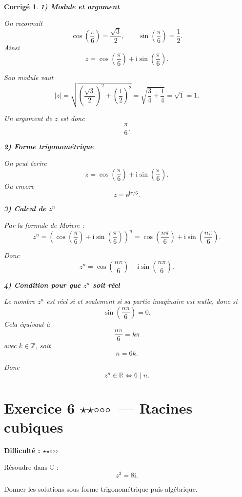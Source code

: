 \documentclass[11pt,a4paper]{article}
\newtheorem*{corrige}{Corrigé}
\newcommand{\C}{\mathbb{C}}
\newcommand{\R}{\mathbb{R}}
\newcommand{\ii}{\mathrm{i}}
\newcommand{\e}{\mathrm{e}}
\newcommand{\fullstar}{\(\star\)}
\newcommand{\emptystar}{\(\circ\)}
\newcommand{\twoStars}{\fullstar\fullstar\emptystar\emptystar\emptystar}
\newcommand{\difficulty}[1]{\textbf{Difficulté : #1}}
\begin{document}
\begin{corrige}
\textbf{1) Module et argument}

On reconnaît
\[
\cos\left(\frac{\pi}{6}\right)=\frac{\sqrt3}{2},
\qquad
\sin\left(\frac{\pi}{6}\right)=\frac12.
\]
Ainsi
\[
z=\cos\left(\frac{\pi}{6}\right)+\ii\sin\left(\frac{\pi}{6}\right).
\]

Son module vaut
\[
|z|=\sqrt{\left(\frac{\sqrt3}{2}\right)^2+\left(\frac12\right)^2}
=\sqrt{\frac34+\frac14}=\sqrt1=1.
\]

Un argument de \(z\) est donc
\[
\frac{\pi}{6}.
\]

\textbf{2) Forme trigonométrique}

On peut écrire
\[
z=\cos\left(\frac{\pi}{6}\right)+\ii\sin\left(\frac{\pi}{6}\right).
\]
Ou encore
\[
z=\e^{\ii\pi/6}.
\]

\textbf{3) Calcul de \(z^n\)}

Par la formule de Moivre :
\[
z^n=\left(\cos\left(\frac{\pi}{6}\right)+\ii\sin\left(\frac{\pi}{6}\right)\right)^n
=\cos\left(\frac{n\pi}{6}\right)+\ii\sin\left(\frac{n\pi}{6}\right).
\]

Donc
\[
\boxed{z^n=\cos\left(\frac{n\pi}{6}\right)+\ii\sin\left(\frac{n\pi}{6}\right)}.
\]

\textbf{4) Condition pour que \(z^n\) soit réel}

Le nombre \(z^n\) est réel si et seulement si sa partie imaginaire est nulle, donc si
\[
\sin\left(\frac{n\pi}{6}\right)=0.
\]
Cela équivaut à
\[
\frac{n\pi}{6}=k\pi
\]
avec \(k\in\mathbb{Z}\), soit
\[
n=6k.
\]

Donc
\[
\boxed{z^n\in\R \iff 6\mid n}.
\]
\end{corrige}

\section{Exercice 6 \twoStars\ --- Racines cubiques}
\difficulty{\twoStars}

Résoudre dans \(\C\) :
\[
z^3=8\ii.
\]

Donner les solutions sous forme trigonométrique puis algébrique.
\end{document}
